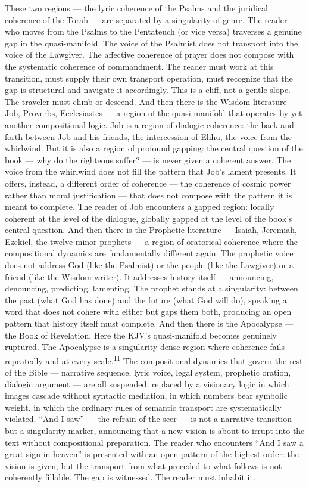 These two regions — the lyric coherence of the Psalms and the juridical coherence of the Torah — are separated by a singularity of genre. The reader who moves from the Psalms to the Pentateuch (or vice versa) traverses a genuine gap in the quasi-manifold. The voice of the Psalmist does not transport into the voice of the Lawgiver. The affective coherence of prayer does not compose with the systematic coherence of commandment. The reader must work at this transition, must supply their own transport operation, must recognize that the gap is structural and navigate it accordingly. This is a cliff, not a gentle slope. The traveler must climb or descend. And then there is the Wisdom literature — Job, Proverbs, Ecclesiastes — a region of the quasi-manifold that operates by yet another compositional logic. Job is a region of dialogic coherence: the back-and-forth between Job and his friends, the intercession of Elihu, the voice from the whirlwind. But it is also a region of profound gapping: the central question of the book — why do the righteous suffer? — is never given a coherent answer. The voice from the whirlwind does not fill the pattern that Job’s lament presents. It offers, instead, a different order of coherence — the coherence of cosmic power rather than moral justification — that does not compose with the pattern it is meant to complete. The reader of Job encounters a gapped region: locally coherent at the level of the dialogue, globally gapped at the level of the book’s central question. And then there is the Prophetic literature — Isaiah, Jeremiah, Ezekiel, the twelve minor prophets — a region of oratorical coherence where the compositional dynamics are fundamentally different again. The prophetic voice does not address God (like the Psalmist) or the people (like the Lawgiver) or a friend (like the Wisdom writer). It addresses history itself — announcing, denouncing, predicting, lamenting. The prophet stands at a singularity: between the past (what God has done) and the future (what God will do), speaking a word that does not cohere with either but gaps them both, producing an open pattern that history itself must complete. And then there is the Apocalypse — the Book of Revelation. Here the KJV’s quasi-manifold becomes genuinely ruptured. The Apocalypse is a singularity-dense region where coherence fails repeatedly and at every scale.\textsuperscript{11} The compositional dynamics that govern the rest of the Bible — narrative sequence, lyric voice, legal system, prophetic oration, dialogic argument — are all suspended, replaced by a visionary logic in which images cascade without syntactic mediation, in which numbers bear symbolic weight, in which the ordinary rules of semantic transport are systematically violated. “And I saw” — the refrain of the seer — is not a narrative transition but a singularity marker, announcing that a new vision is about to irrupt into the text without compositional preparation. The reader who encounters “And I saw a great sign in heaven” is presented with an open pattern of the highest order: the vision is given, but the transport from what preceded to what follows is not coherently fillable. The gap is witnessed. The reader must inhabit it.

